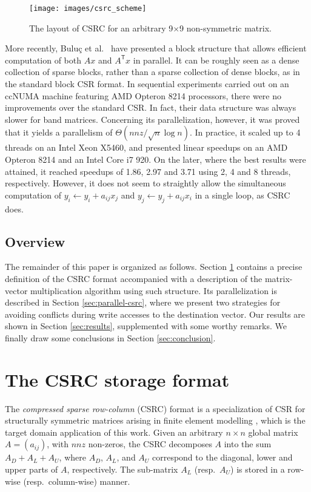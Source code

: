 \documentclass[11pt]{article}
\begin{document}
\begin{figure}[!t]
\centering
\texttt{[image: images/csrc\_scheme]}
\caption{The layout of CSRC for an arbitrary 9$\times$9 non-symmetric matrix.}
\label{fig:csrc_scheme}
\end{figure}

More recently, Bulu{\c{c}} et al.~\cite{BFFGL09a} have presented a block structure that allows
efficient computation of both $Ax$ and $A^{\mathsf{T}}x$ in parallel.  It can
be roughly seen as a dense collection of sparse blocks, rather than a sparse
collection of dense blocks, as in the standard block CSR format.  In
sequential experiments carried out on an ccNUMA machine featuring AMD Opteron 8214
processors, there were no improvements over the standard CSR.
In fact, their data structure was always slower for band matrices.  Concerning
its parallelization, however, it was proved that it yields a
parallelism of $\Theta(nnz/\sqrt{n}\log n)$.
In practice, it scaled up to 4 threads on an Intel Xeon X5460, and
presented linear speedups on an AMD Opteron 8214 and an Intel Core i7 920.  On
the later, where the best results were attained, it reached speedups of 1.86,
2.97 and 3.71 using 2, 4 and 8 threads, respectively. However,
it does not seem to straightly allow the simultaneous
computation of $y_i \leftarrow y_i + a_{ij} x_j$ and $y_j \leftarrow y_j +
a_{ij} x_i$ in a single loop, as CSRC does.

\subsection{Overview}

The remainder of this paper is organized as follows.  Section \ref{sec:csrc}
contains a precise definition of the CSRC format accompanied with a description
of the matrix-vector multiplication algorithm using such structure.  Its
parallelization is described in Section \ref{sec:parallel-csrc}, where we
present two strategies for avoiding conflicts during write accesses to
the destination vector.  Our results are shown in Section \ref{sec:results},
supplemented with some worthy remarks.  We finally draw some conclusions in
Section \ref{sec:conclusion}.

\section{The CSRC storage format}
\label{sec:csrc}

The \textit{compressed sparse row-column} (CSRC) format is a specialization of
CSR for structurally symmetric matrices arising in finite element modelling
\cite{RF07a}, which is the target domain application of this work.  Given an
arbitrary $n \times n$ global matrix $A = (a_{ij})$, with $nnz$
non-zeros, the CSRC decomposes $A$ into the sum $A_D + A_L + A_U$, where $A_D$,
$A_L$, and $A_U$ correspond to the diagonal, lower and upper parts of $A$,
respectively.  The sub-matrix $A_L$ (resp.~$A_U$) is stored in a row-wise
(resp.~column-wise) manner.
\end{document}
